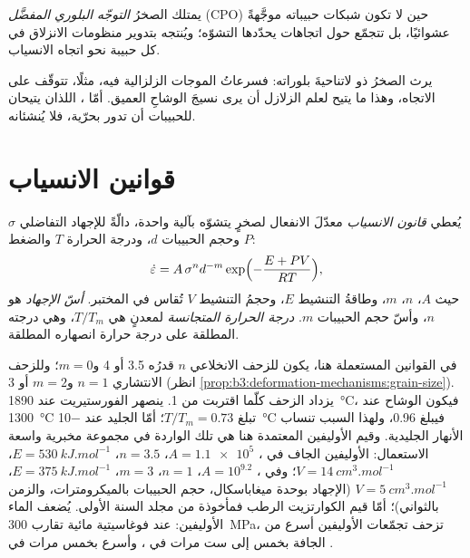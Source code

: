 \begin{definition}\label{def:b3:deformation-mechanisms:cpo}
يمتلك الصخرُ \emph{التوجّه البلوري المفضَّل}
(CPO) حين لا تكون شبكات حبيباته موجَّهةً
عشوائيًا، بل تتجمّع حول اتجاهات يحدّدها التشوّه؛ ويُنتجه 
بتدوير منظومات الانزلاق في كل حبيبة نحو اتجاه الانسياب.
\end{definition}

يرث الصخرُ ذو  لاتناحيةَ بلوراته: فسرعاتُ الموجات الزلزالية فيه،
مثلًا، تتوقّف على الاتجاه، وهذا ما يتيح لعلم الزلازل أن يرى نسيجَ
الوشاحِ العميق. أمّا  ، اللذان يتيحان
للحبيبات أن تدور بحرّية، فلا يُنشئانه.

\section{قوانين الانسياب}

\begin{definition}\label{def:b3:deformation-mechanisms:flow-law}
يُعطي \emph{قانون الانسياب} معدّلَ الانفعال لصخرٍ يتشوّه
بآلية واحدة، دالّةً للإجهاد التفاضلي $\sigma$ وحجم الحبيبات
$d$، ودرجة الحرارة $T$ والضغط $P$:
\[
  \dot\varepsilon = A\,\sigma^nd^{-m}\exp\Bigl(-\frac{E + PV}{RT}\Bigr),
\]
حيث $A$، $n$، $m$، وطاقةُ التنشيط $E$، وحجمُ التنشيط $V$
تُقاس في المختبر. \emph{أسّ الإجهاد} هو $n$،
وأسّ حجم الحبيبات $m$. \emph{درجة الحرارة
المتجانسة} لمعدنٍ هي $T/T_m$، وهي
درجته المطلقة على درجة حرارة انصهاره المطلقة.
\end{definition}

في القوانين المستعملة هنا، يكون للزحف الانخلاعي $n$ قدرُه 3.5 أو 4 و$m = 0$؛
وللزحف الانتشاري $n = 1$ و$m = 2$ أو 3 (انظر \cref{prop:b3:deformation-mechanisms:grain-size}).
يزداد الزحف كلّما اقتربت  من 1. ينصهر الفورستيريت عند \qty{1890}{\celsius}، فيكون الوشاح عند \qty{1300}{\celsius}
تبلغ $T/T_m = 0.73$؛ أمّا الجليد عند \qty{-10}{\celsius} فيبلغ 0.96، ولهذا السبب
تنساب الأنهار الجليدية. وقيم الأوليفين المعتمدة هنا هي تلك الواردة في
مجموعة مخبرية واسعة الاستعمال: الأوليفين الجاف في ، $A =
\num{1.1e5}$، $n = 3.5$، $E = \qty{530}{kJ.mol^{-1}}$، $V =
\qty{14}{cm^3.mol^{-1}}$؛ وفي ، $A = 10^{9.2}$، $n = 1$، $m = 3$،
$E = \qty{375}{kJ.mol^{-1}}$، $V = \qty{5}{cm^3.mol^{-1}}$ (الإجهاد بوحدة ميغاباسكال،
حجم الحبيبات بالميكرومترات، والزمن بالثواني)؛ أمّا قيم الكوارتزيت الرطب فمأخوذة من
مجلد السنة الأولى. يُضعف الماء الأوليفين: عند فوغاسيتية مائية تقارب
\qty{300}{MPa}، تزحف تجمّعات الأوليفين أسرع من الجافة بخمس إلى ست مرات
في ، وأسرع بخمس مرات في .

